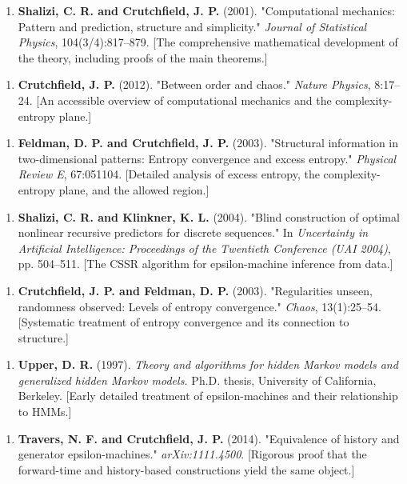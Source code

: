 \begin{enumerate}
  \item \textbf{Shalizi, C. R. and Crutchfield, J. P.} (2001). "Computational mechanics: Pattern and prediction, structure and simplicity." \textit{Journal of Statistical Physics}, 104(3/4):817--879. [The comprehensive mathematical development of the theory, including proofs of the main theorems.]
\end{enumerate}

\begin{enumerate}
  \item \textbf{Crutchfield, J. P.} (2012). "Between order and chaos." \textit{Nature Physics}, 8:17--24. [An accessible overview of computational mechanics and the complexity-entropy plane.]
\end{enumerate}

\begin{enumerate}
  \item \textbf{Feldman, D. P. and Crutchfield, J. P.} (2003). "Structural information in two-dimensional patterns: Entropy convergence and excess entropy." \textit{Physical Review E}, 67:051104. [Detailed analysis of excess entropy, the complexity-entropy plane, and the allowed region.]
\end{enumerate}

\begin{enumerate}
  \item \textbf{Shalizi, C. R. and Klinkner, K. L.} (2004). "Blind construction of optimal nonlinear recursive predictors for discrete sequences." In \textit{Uncertainty in Artificial Intelligence: Proceedings of the Twentieth Conference (UAI 2004)}, pp. 504--511. [The CSSR algorithm for epsilon-machine inference from data.]
\end{enumerate}

\begin{enumerate}
  \item \textbf{Crutchfield, J. P. and Feldman, D. P.} (2003). "Regularities unseen, randomness observed: Levels of entropy convergence." \textit{Chaos}, 13(1):25--54. [Systematic treatment of entropy convergence and its connection to structure.]
\end{enumerate}

\begin{enumerate}
  \item \textbf{Upper, D. R.} (1997). \textit{Theory and algorithms for hidden Markov models and generalized hidden Markov models.} Ph.D. thesis, University of California, Berkeley. [Early detailed treatment of epsilon-machines and their relationship to HMMs.]
\end{enumerate}

\begin{enumerate}
  \item \textbf{Travers, N. F. and Crutchfield, J. P.} (2014). "Equivalence of history and generator epsilon-machines." \textit{arXiv:1111.4500}. [Rigorous proof that the forward-time and history-based constructions yield the same object.]
\end{enumerate}
